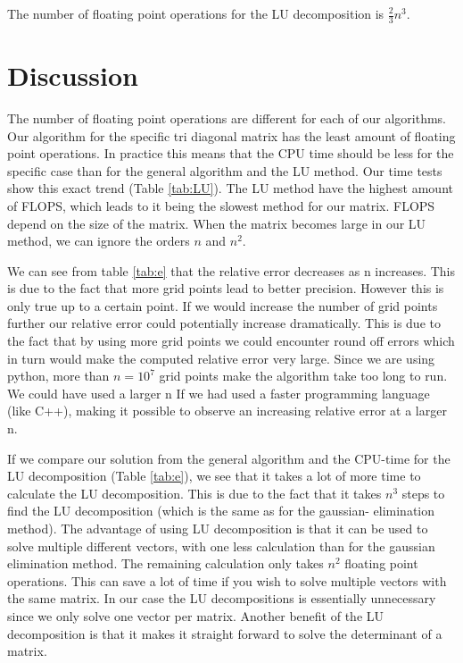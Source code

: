 \documentclass[norsk,a4paper,12pt]{article}
\begin{document}
The number of floating point operations for the LU decomposition is $\frac{2}{3} n^3$.

\section{Discussion}

The number of floating point operations are different for each of our algorithms. Our algorithm for the specific tri diagonal matrix has the least amount of floating point operations. In practice this means that the CPU time should be less for the specific case than for the general algorithm and the LU method. Our time tests show this exact trend (Table \ref{tab:LU}). The LU method have the highest amount of FLOPS, which leads to it being the slowest method for our matrix. FLOPS depend on the size of the matrix. When the matrix becomes large in our LU method, we can ignore the orders $n$ and $n^2$.     

We can see from table \ref{tab:e} that the relative error decreases as n increases. This is due to the fact that more grid points lead to better precision. However this is only true up to a certain point. If we would increase the number of grid points further our relative error could potentially increase dramatically. This is due to the fact that by using more grid points we could encounter round off errors which in turn would make the computed relative error very large. Since we are using python, more than $n=10^7$ grid points make the algorithm take too long to run. We could have used a larger n If we had used a faster programming language (like C++), making it possible to observe an increasing relative error at a larger n.

If we compare our solution from the general algorithm and the CPU-time for the LU decomposition (Table \ref{tab:e}), we see that it takes a lot of more time to calculate the LU decomposition. This is due to the fact that it takes $n^3$ steps to find the LU decomposition (which is the same as for the gaussian- elimination method). The advantage of using LU decomposition is that it can be used to solve multiple different vectors, with one less calculation than for the gaussian elimination method. The remaining calculation only takes $n^2$ floating point operations. This can save a lot of time if you wish to solve multiple vectors with the same matrix. In our case the LU decompositions is essentially unnecessary since we only solve one vector per matrix. Another benefit of the LU decomposition is that it makes it straight forward to solve the determinant of a matrix.
\end{document}
